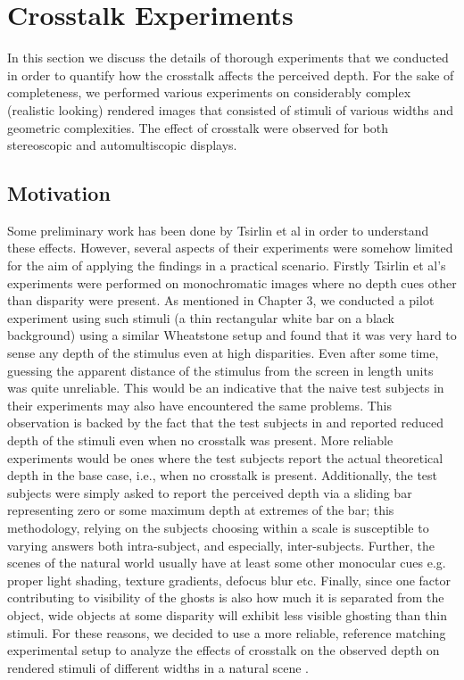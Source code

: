 \chapter{Crosstalk Experiments}
\label{chap:experiments}
In this section we discuss the details of thorough experiments that we conducted in order to quantify how the crosstalk affects the perceived depth. For the sake of completeness, we performed various experiments on considerably complex (realistic looking) rendered images that consisted of stimuli of various widths and geometric complexities. The effect of crosstalk were observed for both stereoscopic and automultiscopic displays.

\section{Motivation}
 Some preliminary work has been done by Tsirlin et al\cite{tsirlin2011effect}\cite{tsirlin2012crosstalk}\cite{tsirlin2012effect} in order to understand these effects. However, several aspects of their experiments were somehow limited for the aim of applying the findings in a practical scenario. Firstly Tsirlin et al's experiments were performed on monochromatic images where no depth cues other than disparity were present. As mentioned in Chapter 3, we conducted a pilot experiment using such stimuli (a thin rectangular white bar on a black background) using a similar Wheatstone setup and found that it was very hard to sense any depth of the stimulus even at high disparities. Even after some time, guessing the apparent distance of the stimulus from the screen in length units was quite unreliable. This would be an indicative that the naive test subjects in their experiments may also have encountered the same problems. This observation is backed by the fact that the test subjects in \cite{tsirlin2012effect} and \cite{tsirlin2011effect} reported reduced depth of the stimuli even when no crosstalk was present. More reliable experiments would be ones where the test subjects report the actual theoretical depth in the base case, i.e., when no crosstalk is present. Additionally, the test subjects were simply asked to report the perceived depth via a sliding bar representing zero or some maximum depth at extremes of the bar; this methodology, relying on the subjects choosing within a scale is susceptible to varying answers both intra-subject, and especially, inter-subjects. Further, the scenes of the natural world usually have at least some other monocular cues e.g. proper light shading, texture gradients, defocus blur etc. Finally, since one factor contributing to visibility of the ghosts is also how much it is separated from the object, wide objects at some disparity will exhibit less visible ghosting than thin stimuli. For these reasons, we decided to use a more reliable, reference matching experimental setup to analyze the effects of crosstalk on the observed depth on rendered stimuli of different widths in a natural scene .

